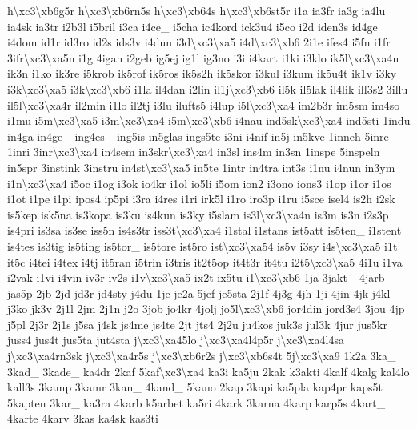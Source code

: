 \begin{DoxyCompactItemize}
h\textbackslash{}xc3\textbackslash{}xb6g5r h\textbackslash{}xc3\textbackslash{}xb6rn5s h\textbackslash{}xc3\textbackslash{}xb64s h\textbackslash{}xc3\textbackslash{}xb6st5r i1a ia3fr ia3g ia4lu ia4sk ia3tr i2b3l i5bril i3ca i4ce\-\_\- i5cha ic4kord ick3u4 i5co i2d iden3s id4ge i4dom id1r id3ro id2s ids3v i4dun i3d\textbackslash{}xc3\textbackslash{}xa5 i4d\textbackslash{}xc3\textbackslash{}xb6 2i1e ifes4 i5fn i1fr 3ifr\textbackslash{}xc3\textbackslash{}xa5n i1g 4igan i2geb ig5ej ig1l ig3no i3i i4kart i1ki i3klo ik5l\textbackslash{}xc3\textbackslash{}xa4n ik3n i1ko ik3re i5krob ik5rof ik5ros ik5s2h ik5skor i3kul i3kum ik5u4t ik1v i3ky i3k\textbackslash{}xc3\textbackslash{}xa5 i3k\textbackslash{}xc3\textbackslash{}xb6 i1la il4dan i2lin il1j\textbackslash{}xc3\textbackslash{}xb6 il5k il5lak il4lik ill3s2 3illu il5l\textbackslash{}xc3\textbackslash{}xa4r il2min i1lo il2tj i3lu ilufts5 i4lup i5l\textbackslash{}xc3\textbackslash{}xa4 im2b3r im5sm im4so i1mu i5m\textbackslash{}xc3\textbackslash{}xa5 i3m\textbackslash{}xc3\textbackslash{}xa4 i5m\textbackslash{}xc3\textbackslash{}xb6 i4nau ind5sk\textbackslash{}xc3\textbackslash{}xa4 ind5sti 1indu in4ga in4ge\-\_\- ing4es\-\_\- ing5is in5glas ings5te i3ni i4nif in5j in5kve 1inneh 5inre 1inri 3inr\textbackslash{}xc3\textbackslash{}xa4 in4sem in3skr\textbackslash{}xc3\textbackslash{}xa4 in3sl ins4m in3sn 1inspe 5inspeln in5spr 3instink 3instru in4st\textbackslash{}xc3\textbackslash{}xa5 in5te 1intr in4tra int3s i1nu i4nun in3ym i1n\textbackslash{}xc3\textbackslash{}xa4 i5oc i1og i3ok io4kr i1ol io5li i5om ion2 i3ono ions3 i1op i1or i1os i1ot i1pe i1pi ipos4 ip5pi i3ra i4res i1ri irk5l i1ro iro3p i1ru i5sce isel4 is2h i2sk is5kep isk5na is3kopa is3ku is4kun is3ky i5slam is3l\textbackslash{}xc3\textbackslash{}xa4n is3m is3n i2s3p is4pri is3sa is3se iss5n is4s3tr iss3t\textbackslash{}xc3\textbackslash{}xa4 i1stal i1stans ist5att is5ten\-\_\- i1stent is4tes is3tig is5ting is5tor\-\_\- is5tore ist5ro ist\textbackslash{}xc3\textbackslash{}xa54 is5v i3sy i4s\textbackslash{}xc3\textbackslash{}xa5 i1t it5c i4tei i4tex i4tj it5ran i5trin i3tris it2t5op it4t3r it4tu i2t5\textbackslash{}xc3\textbackslash{}xa5 4i1u i1va i2vak i1vi i4vin iv3r iv2s i1v\textbackslash{}xc3\textbackslash{}xa5 ix2t ix5tu i1\textbackslash{}xc3\textbackslash{}xb6 1ja 3jakt\-\_\- 4jarb jas5p 2jb 2jd jd3r jd4sty j4du 1je je2a 5jef je5sta 2j1f 4j3g 4jh 1ji 4jin 4jk j4kl j3ko jk3v 2j1l 2jm 2j1n j2o 3job jo4kr 4jolj jo5l\textbackslash{}xc3\textbackslash{}xb6 jor4din jord3s4 3jou 4jp j5pl 2j3r 2j1s j5sa j4sk js4me js4te 2jt jts4 2j2u ju4kos juk3s jul3k 4jur jus5kr juss4 jus4t jus5ta jut4sta j\textbackslash{}xc3\textbackslash{}xa45lo j\textbackslash{}xc3\textbackslash{}xa4l4p5r j\textbackslash{}xc3\textbackslash{}xa4l4sa j\textbackslash{}xc3\textbackslash{}xa4rn3sk j\textbackslash{}xc3\textbackslash{}xa4r5s j\textbackslash{}xc3\textbackslash{}xb6r2s j\textbackslash{}xc3\textbackslash{}xb6s4t 5j\textbackslash{}xc3\textbackslash{}xa9 1k2a 3ka\-\_\- 3kad\-\_\- 3kade\-\_\- ka4dr 2kaf 5kaf\textbackslash{}xc3\textbackslash{}xa4 ka3i ka5ju 2kak k3akti 4kalf 4kalg kal4lo kall3s 3kamp 3kamr 3kan\-\_\- 4kand\-\_\- 5kano 2kap 3kapi ka5pla kap4pr kaps5t 5kapten 3kar\-\_\- ka3ra 4karb k5arbet ka5ri 4kark 3karna 4karp karp5s 4kart\-\_\- 4karte 4karv 3kas ka4sk kas3ti 
\end{DoxyCompactItemize}
